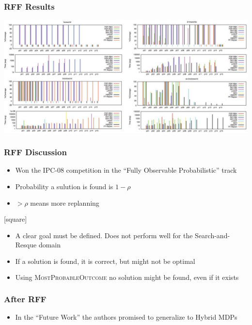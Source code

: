 \documentclass{beamer}
\let\origframetitle=\frametitle
\renewcommand\frametitle[1]{\origframetitle{\textbf{\large{\textrm{#1}}}}}
\begin{document}
\begin{frame}
  \frametitle{RFF Results}

  \includegraphics[width=\textwidth]{images/rff-results.pdf}
\end{frame}

\begin{frame}
  \frametitle{RFF Discussion}

  \begin{itemize}
    \item Won the IPC-08 competition in the ``Fully Observable Probabilistic'' track
    \item Probability a sulution is found is $1 - \rho$
    \item $> \rho$ means more replanning
  \end{itemize}

  [square]
  \begin{itemize}
    \item A clear goal must be defined. Does not perform well for the Search-and-Resque domain
    \item If a solution is found, it is correct, but might not be optimal
    \item Using \textsc{MostProbableOutcome} no solution might be found, even if it exists
  \end{itemize}

\end{frame}

\begin{frame}
  \frametitle{After RFF}

  \begin{itemize}
    \item In the ``Future Work'' the authors promised to generalize to Hybrid MDPs
  \end{itemize}

\end{frame}
\end{document}
